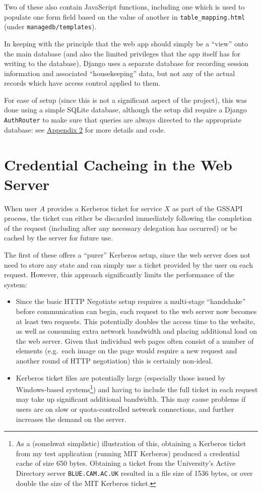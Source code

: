 \documentclass{report}
\begin{document}
Two of these also contain JavaScript functions, including one which is used to populate one form field based on the value of another in \verb+table_mapping.html+ (under \texttt{managedb/templates}).

In keeping with the principle that the web app should simply be a ``view'' onto the main database (and also the limited privileges that the app itself has for writing to the database), Django uses a separate database for recording session information and associated ``housekeeping'' data, but not any of the actual records which have access control applied to them.

For ease of setup (since this is not a significant aspect of the project), this was done using a simple SQLite database, although the setup did require a Django \texttt{AuthRouter} to make sure that queries are always directed to the appropriate database: see \hyperref[sec:appendix2]{Appendix 2} for more details and code.

\section{Credential Cacheing in the Web Server}
\label{sec:credential_cacheing}
When user $A$ provides a Kerberos ticket for service $X$ as part of the GSSAPI process, the ticket can either be discarded immediately following the completion of the request (including after any necessary delegation has occurred) or be cached by the server for future use.

The first of these offers a ``purer'' Kerberos setup, since the web server does not need to store any state and can simply use a ticket provided by the user on each request. However, this approach significantly limits the performance of the system:
\begin{itemize}
\item
  Since the basic HTTP Negotiate setup requires a multi-stage ``handshake'' before communication can begin, each request to the web server now becomes at least two requests. This potentially doubles the access time to the website, as well as consuming extra network bandwidth and placing additional load on the web server. Given that individual web pages often consist of a number of elements (e.g.\ each image on the page would require a new request and another round of HTTP negotiation) this is certainly non-ideal.
\item
  Kerberos ticket files are potentially large (especially those issued by Windows-based systems\footnote{As a (somehwat simplistic) illustration of this, obtaining a Kerberos ticket from my test application (running MIT Kerberos) produced a credential cache of size 650 bytes. Obtaining a ticket from the University's Active Directory server \texttt{BLUE.CAM.AC.UK} resulted in a file size of 1536 bytes, or over double the size of the MIT Kerberos ticket.}) and having to include the full ticket in each request may take up significant additional bandwidth. This may cause problems if users are on slow or quota-controlled network connections, and further increases the demand on the server.
\end{itemize}
\end{document}
